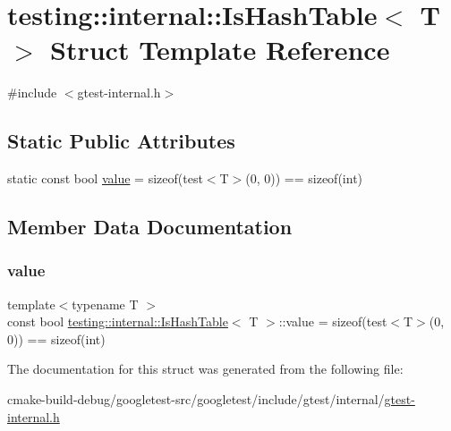 \hypertarget{structtesting_1_1internal_1_1IsHashTable}{}\section{testing\+::internal\+::Is\+Hash\+Table$<$ T $>$ Struct Template Reference}
\label{structtesting_1_1internal_1_1IsHashTable}


{\ttfamily \#include $<$gtest-\/internal.\+h$>$}

\subsection*{Static Public Attributes}
\begin{DoxyCompactItemize}
\item 
static const bool \mbox{\hyperlink{structtesting_1_1internal_1_1IsHashTable_a165e0a3eddfa5fadf9b950be6432d848}{value}} = sizeof(test$<$T$>$(0, 0)) == sizeof(int)
\end{DoxyCompactItemize}


\subsection{Member Data Documentation}
\mbox{\label{structtesting_1_1internal_1_1IsHashTable_a165e0a3eddfa5fadf9b950be6432d848}} 
\subsubsection{\texorpdfstring{value}{value}}
{\footnotesize\ttfamily template$<$typename T $>$ \\
const bool \mbox{\hyperlink{structtesting_1_1internal_1_1IsHashTable}{testing\+::internal\+::\+Is\+Hash\+Table}}$<$ T $>$\+::value = sizeof(test$<$T$>$(0, 0)) == sizeof(int)\hspace{0.3cm}{\ttfamily [static]}}



The documentation for this struct was generated from the following file\+:\begin{DoxyCompactItemize}
\item 
cmake-\/build-\/debug/googletest-\/src/googletest/include/gtest/internal/\mbox{\hyperlink{gtest-internal_8h}{gtest-\/internal.\+h}}\end{DoxyCompactItemize}
